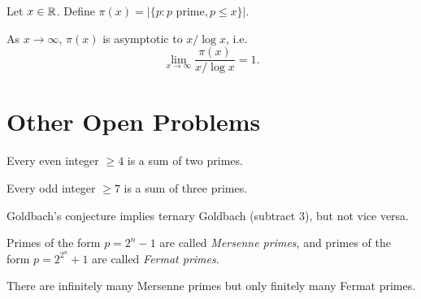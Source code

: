 \begin{definition}
  Let $x \in \mathbb{R}$. Define
  $\pi(x) = |{\{p : \text{$p$ prime}, p \le x\}}|$.
\end{definition}

\begin{theorem}
  As $x \to \infty$,
  $\pi(x)$ is asymptotic to $x / {\log x}$,
  i.e.
  \[
    \lim_{x \to \infty}
    \frac{\pi(x)}{x / {\log x}} = 1.
  \]
\end{theorem}

\section{Other Open Problems}

\begin{conjecture}[Goldbach]
  Every even integer $\ge 4$ is a sum
  of two primes.
\end{conjecture}

\begin{theorem}
  Every odd integer $\ge 7$ is a sum of
  three primes.
\end{theorem}

\begin{remark}
  Goldbach's conjecture implies
  ternary Goldbach (subtract $3$), but not
  vice versa.
\end{remark}

\begin{definition}
  Primes of the form $p = 2^n - 1$
  are called \emph{Mersenne primes}, and
  primes of the form $p = 2^{2^n} + 1$
  are called \emph{Fermat primes}.
\end{definition}

\begin{conjecture}
  There are infinitely many Mersenne
  primes but only finitely many
  Fermat primes.
\end{conjecture}
